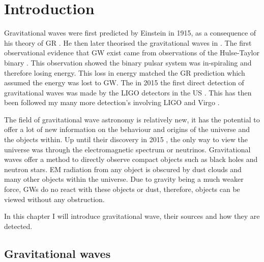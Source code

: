 \chapter{Introduction}


Gravitational waves were first predicted by Einstein in 1915, as a consequence of his theory of \ac{GR} \cite{}. He then later theorised the gravitational waves in \cite{}.
The first observational evidence that \ac{GW} exist came from observations of the Hulse-Taylor binary \cite{}. 
This observation showed the binary pulsar system was in-spiraling and therefore losing energy.
This loss in energy matched the \ac{GR} prediction which assumed the energy was lost to \ac{GW}.
The in 2015 the first direct detection of gravitational waves was made by the \ac{LIGO} detectors in the US \cite{}.
This has then been followed my many more detection's involving \ac{LIGO} and Virgo \cite{}.

The field of gravitational wave astronomy is relatively new, it has the potential to offer a lot of new information on the behaviour and origins of the universe and the objects within. 
Up until their discovery in 2015 \cite{}, the only way to view the universe was through the electromagnetic spectrum or neutrinos. 
Gravitational waves offer a method to directly observe compact objects such as black holes and neutron stars. 
\ac{EM} radiation from any object is obscured by dust clouds and many other objects within the universe.
Due to gravity being a much weaker force, \acp{GW} do no react with these objects or dust, therefore, objects can be viewed without any obstruction. 

In this chapter I will introduce gravitational wave, their sources and how they are detected. 


\section{Gravitational waves}

